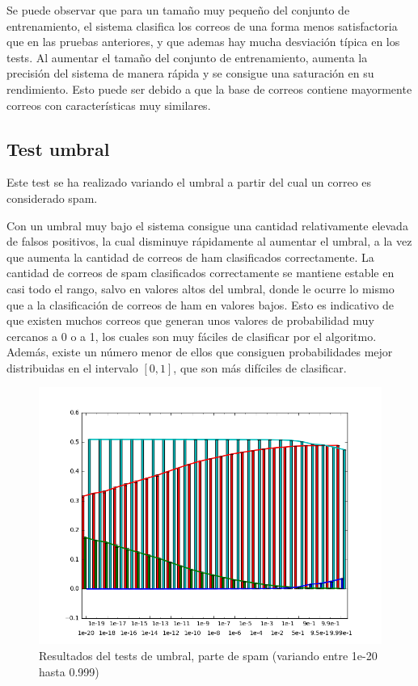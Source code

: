 Se puede observar que para un tamaño muy pequeño del conjunto de entrenamiento,
el sistema clasifica los correos de una forma menos satisfactoria que en las
pruebas anteriores, y que ademas hay mucha desviación típica en los tests. Al
aumentar el tamaño del conjunto de entrenamiento, aumenta la precisión del
sistema de manera rápida y se consigue una saturación en su rendimiento. Esto
puede ser debido a que la base de correos contiene mayormente correos con
características muy similares.

\clearpage
\subsection{Test umbral}

Este test se ha realizado variando el umbral a partir del cual un correo es
considerado spam.

Con un umbral muy bajo el sistema consigue una cantidad relativamente elevada
de falsos positivos, la cual disminuye rápidamente al aumentar el umbral, a la
vez que aumenta la cantidad de correos de ham clasificados correctamente. La
cantidad de correos de spam clasificados correctamente se mantiene estable en
casi todo el rango, salvo en valores altos del umbral, donde le ocurre lo mismo
que a la clasificación de correos de ham en valores bajos. Esto es indicativo
de que existen muchos correos que generan unos valores de probabilidad muy
cercanos a 0 o a 1, los cuales son muy fáciles de clasificar por el algoritmo.
Además, existe un número menor de ellos que consiguen probabilidades mejor
distribuidas en el intervalo $[0,1]$, que son más difíciles de clasificar.

\begin{figure}[hb]
	\centering
	\includegraphics[width=\textwidth, keepaspectratio]{img/threshold}
	\caption{Resultados del tests de umbral, parte de spam (variando entre
	1e-20 hasta 0.999)}
	\label{fig:threshold}
\end{figure}

